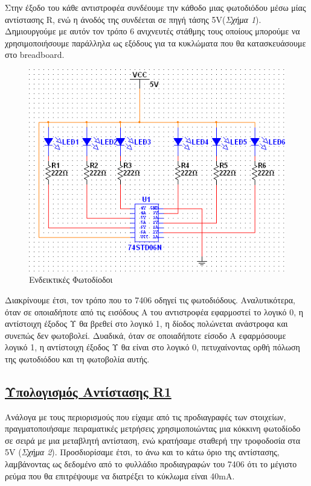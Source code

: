 \documentclass[a4paper,10pt]{article} \usepackage{anysize}
\begin{document}
Στην έξοδο του κάθε αντιστροφέα συνδέουμε την κάθοδο μιας φωτοδιόδου μέσω μίας
αντίστασης R, ενώ η άνοδός της συνδέεται σε πηγή τάσης 5V(\textit{Σχήμα 1}).
Δημιουργούμε με αυτόν τον τρόπο 6 ανιχνευτές στάθμης τους οποίους μπορούμε να
χρησιμοποιήσουμε παράλληλα ως εξόδους  για τα κυκλώματα που θα κατασκευάσουμε
στο breadboard.  
\begin{figure}[H] 
\caption{Ενδεικτικές Φωτοδίοδοι} 
\centering
\includegraphics[scale=0.8]{files/6-leds.png} 
\end{figure} 
\vspace{2cm}
Διακρίνουμε έτσι, τον τρόπο που το 7406 οδηγεί τις φωτοδιόδους. Αναλυτικότερα,
όταν σε οποιαδήποτε από τις εισόδους A του αντιστροφέα εφαρμοστεί το λογικό 0,
η αντίστοιχη έξοδος Υ θα βρεθεί στο λογικό 1, η δίοδος πολώνεται ανάστροφα και
συνεπώς δεν φωτοβολεί. Δυαδικά, όταν σε οποιαδήποτε είσοδο Α εφαρμόσουμε
λογικό 1, η αντίστοιχη έξοδος Υ θα είναι στο λογικό 0, πετυχαίνοντας ορθή
πόλωση της φωτοδιόδου και τη φωτοβολία αυτής.   

\pagebreak 
\subsection*{\textnormal{\underline{Υπολογισμός Αντίστασης R1}}}
Ανάλογα με τους περιορισμούς που είχαμε από τις προδιαγραφές των στοιχείων,
πραγματοποιήσαμε πειραματικές μετρήσεις χρησιμοποιώντας μια κόκκινη φωτοδίοδο
σε σειρά με μια μεταβλητή αντίσταση, ενώ κρατήσαμε σταθερή την τροφοδοσία στα
5V (\textit{Σχήμα 2}). Προσδιορίσαμε έτσι, το άνω και το κάτω όριο της
αντίστασης, λαμβάνοντας ως δεδομένο από το φυλλάδιο προδιαγραφών του 7406 ότι
το μέγιστο ρεύμα που θα επιτρέψουμε να διατρέξει το κύκλωμα είναι 40mA. 
 
\end{document}
